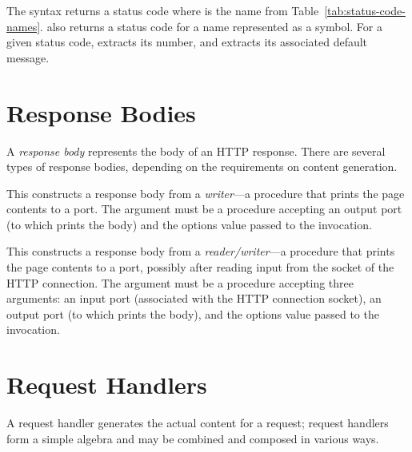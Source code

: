 \begin{desc}
  The  syntax returns a status code where
   is the name from Table~\ref{tab:status-code-names}.
   also returns a status code for a name
  represented as a symbol.  For a given status code,
   extracts its number, and
   extracts its associated default message.
\end{desc}

\section{Response Bodies}
\label{httpd:response-bodies}

A \textit{response body} represents the body of an HTTP response.
There are several types of response bodies, depending on the
requirements on content generation.

\begin{desc}
  This constructs a response body from a \textit{writer}---a procedure
  that prints the page contents to a port.  The  argument
  must be a procedure accepting an output port (to which 
  prints the body) and the options value passed to the 
  invocation.
\end{desc}

\begin{desc}
  This constructs a response body from a \textit{reader/writer}---a
  procedure that prints the page contents to a port, possibly after
  reading input from the socket of the HTTP connection.  The
   argument must be a procedure accepting three arguments:
  an input port (associated with the HTTP connection socket), an
  output port (to which  prints the body), and the options
  value passed to the  invocation.
\end{desc}

\section{Request Handlers}
\label{httpd:request-handlers}

A request handler generates the actual content for a request; request
handlers form a simple algebra and may be combined and composed in
various ways.


